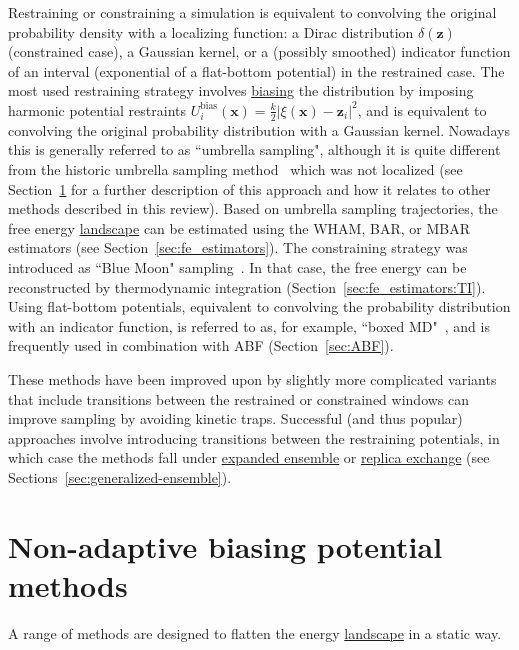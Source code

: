 \documentclass[9pt,review]{livecoms}
\newcommand{\vx}{\mathbf{x}}
\newcommand{\vz}{\mathbf{z}}
\begin{document}
Restraining or constraining a simulation is equivalent
to convolving the original probability density with a localizing function: a Dirac distribution $\delta(\vz)$ (constrained case),
a Gaussian kernel, or a (possibly smoothed) indicator function of an interval (exponential of a flat-bottom potential) in the restrained case.
The most used restraining strategy involves \hyperlink{ref:biasingE} {biasing} the distribution by imposing harmonic potential restraints $U^{\mathrm{bias}}_i(\vx) = \frac{k}{2} |\xi(\vx)-\vz_i|^2$, and is equivalent to convolving the original probability distribution with a Gaussian kernel.
Nowadays this is generally referred to as ``umbrella sampling", although it is quite different from the historic umbrella sampling method~\cite{TORRIE1977187} which was not localized (see Section~\ref{sec:biasing_potential} for a further description of this approach and how it relates to other methods described in this review).
Based on umbrella sampling trajectories, the free energy \hyperlink{ref:FES} {landscape} can be estimated using the WHAM, BAR, or MBAR estimators (see Section~\ref{sec:fe_estimators}). The constraining strategy was introduced as ``Blue Moon" sampling~\cite{doi:10.1080/0892702042000270214}. In that case, the free energy can be reconstructed by thermodynamic integration (Section~\ref{sec:fe_estimators:TI}). Using flat-bottom potentials, equivalent to convolving the probability distribution with an indicator function, is referred to as, for example, ``boxed MD"~\cite{doi:10.1021/jp9074898}, and is frequently used in combination with ABF (Section~\ref{sec:ABF}).

These methods have been improved upon by slightly more complicated variants that include transitions between the restrained or constrained windows can improve sampling by avoiding kinetic traps. Successful (and thus popular) approaches involve introducing transitions between the restraining potentials, in which case the methods fall under \hyperlink{ref:ExpEns} {expanded ensemble} or \hyperlink{ref:ReplEx} {replica exchange} (see Sections~\ref{sec:generalized-ensemble}).


\section{Non-adaptive biasing potential methods}
\label{sec:biasing_potential}

A range of methods are designed to flatten the energy \hyperlink{ref:FES} {landscape} in a static way.
\end{document}
